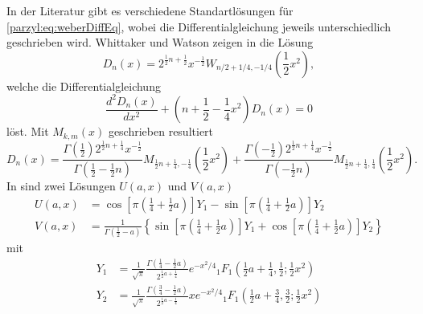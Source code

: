 In der Literatur gibt es verschiedene Standartlösungen für 
\eqref{parzyl:eq:weberDiffEq}, wobei die Differentialgleichung jeweils 
unterschiedlich geschrieben wird.
Whittaker und Watson zeigen in \cite{parzyl:whittaker} die Lösung
\begin{equation}
    D_n(x) = 2^{\frac{1}{2}n + \frac{1}{2}} x^{-\frac{1}{2}} W_{n/2 + 1/4, -1/4}\left(\frac{1}{2}x^2\right),
\end{equation}
welche die Differentialgleichung
\begin{equation}
    \frac{d^2D_n(x)}{dx^2} + \left(n + \frac{1}{2} - \frac{1}{4} x^2\right)D_n(x) = 0
\end{equation}
löst.
Mit $M_{k,m}(x)$ geschrieben resultiert
\begin{equation}
    D_n(x) = \frac{
            \Gamma \left( {\textstyle \frac{1}{2}}\right) 2^{\frac{1}{2}n + \frac{1}{4}} x^{-\frac{1}{2}}
        }{
            \Gamma \left( {\textstyle \frac{1}{2}} - {\textstyle \frac{1}{2}} n \right)
        }
        M_{\frac{1}{2} n + \frac{1}{4}, - \frac{1}{4}} \left(\frac{1}{2}x^2\right)
        +
        \frac{
            \Gamma\left(-{\textstyle \frac{1}{2}}\right) 2^{\frac{1}{2}n + \frac{1}{4}} x^{-\frac{1}{2}}
        }{
            \Gamma\left(- {\textstyle \frac{1}{2}} n\right)
        }
        M_{\frac{1}{2} n + \frac{1}{4}, \frac{1}{4}} \left(\frac{1}{2}x^2\right).
\end{equation}
In \cite{parzyl:abramowitz-stegun} sind zwei Lösungen $U(a, x)$ und $V(a,x)$ 
\begin{align}
    U(a,x) &= 
    \cos\left[\pi \left({\textstyle \frac{1}{4}} + {\textstyle \frac{1}{2}} a\right)\right] Y_1
    - \sin\left[\pi \left({\textstyle \frac{1}{4}} + {\textstyle \frac{1}{2}} a\right)\right] Y_2 
    \label{parzyl:eq:Uaz}
    \\
    V(a,x) &= \frac{1}{\Gamma \left({\textstyle \frac{1}{2} - a}\right)} \left\{
    \sin\left[\pi \left({\textstyle \frac{1}{4}} + {\textstyle \frac{1}{2}} a\right)\right] Y_1
    + \cos\left[\pi \left({\textstyle \frac{1}{4}} + {\textstyle \frac{1}{2}} a\right)\right] Y_2
    \right\}
    \label{parzyl:eq:Vaz}
\end{align}
mit
\begin{align}
    Y_1 &= \frac{1}{\sqrt{\pi}} 
            \frac{\Gamma\left({\textstyle \frac{1}{4} - 
            {\textstyle \frac{1}{2}}a}\right)}
            {2^{\frac{1}{2} a + \frac{1}{4}}}
            e^{-x^2/4} 
            {}_{1} F_{1}
                \left({\textstyle \frac{1}{2}}a + {\textstyle \frac{1}{4}}, 
                {\textstyle \frac{1}{2}} ; 
                {\textstyle \frac{1}{2}}x^2\right)\\
        Y_2 &= \frac{1}{\sqrt{\pi}} 
            \frac{\Gamma\left({\textstyle \frac{3}{4} - 
            {\textstyle \frac{1}{2}}a}\right)}
            {2^{\frac{1}{2} a - \frac{1}{4}}} 
            x e^{-x^2/4} 
            {}_{1} F_{1}
                \left({\textstyle \frac{1}{2}}a + {\textstyle \frac{3}{4}}, 
                {\textstyle \frac{3}{2}} ; 
                {\textstyle \frac{1}{2}}x^2\right)
\end{align}
